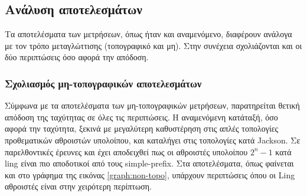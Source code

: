 


   













\clearpage
\subsection{Ανάλυση αποτελεσμάτων}
Τα αποτελέσματα των μετρήσεων, όπως ήταν και αναμενόμενο, διαφέρουν ανάλογα με τον τρόπο μεταγλώττισης (τοπογραφικό και μη). Στην συνέχεια σχολιάζονται και οι δύο περιπτώσεις όσο αφορά την απόδοση. 

\subsubsection{Σχολιασμός μη-τοπογραφικών αποτελεσμάτων}
Σύμφωνα με τα αποτελέσματα των μη-τοπογραφικών μετρήσεων, παρατηρείται θετική απόδοση της ταχύτητας σε όλες τις περιπτώσεις. Η αναμενόμενη κατάταξή, όσο αφορά την ταχύτητα, ξεκινά με μεγαλύτερη καθυστέρηση στις απλές τοπολογίες προθεματικών αθροιστών υπολοίπου, και καταλήγει στις τοπολογίες κατά Jackson. Σε παρελθοντικές έρευνες \cite{1377160} και \cite{4633502} έχει αποδειχθεί πως οι αθροιστές υπολοίπου $2^n-1$ κατά ling είναι πιο αποδοτικοί από τους simple-prefix. Στα αποτελέσματα, όπως φαίνεται και στο γράφημα της εικόνας \ref{graph:non-topo}, υπάρχουν περιπτώσεις όπου οι Ling αθροιστές είναι στην χειρότερη περίπτωση.


